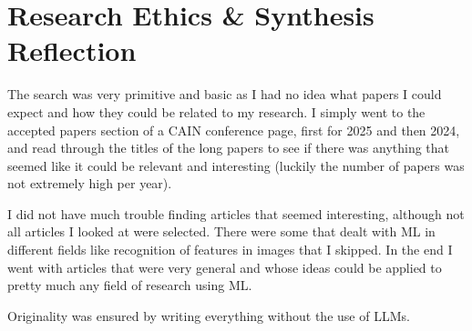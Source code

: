 \documentclass[11pt]{article}
\begin{document}
\begin{comment}
    3: get the best hyperparameter combination based on whatever performance metric you like (calculated for each combination of parameters)
    \item what was evaluated: effectiveness of t-way testing for hpo compared to the others + different values of t for time efficiency & model performance
    \item used t = 2 as they found out that it's enough
    \item used the same number of runs for all hpo strategies (because they wanted to be fair), but does it not make sense to use however many make sense for the particular method? if it's fewer than the others, is that not a strength of the method?
    \item they talk a lot about the performance gains from t-way testing, but not much about the time efficiency (where bayesian optimisation was best most of the time)
\end{itemize}

\end{comment}

\section{Research Ethics \& Synthesis Reflection}

The search was very primitive and basic as I had no idea what papers I could expect and how they could be related to my research. I simply went to the accepted papers section of a CAIN conference page, first for 2025 and then 2024, and read through the titles of the long papers to see if there was anything that seemed like it could be relevant and interesting (luckily the number of papers was not extremely high per year).

I did not have much trouble finding articles that seemed interesting, although not all articles I looked at were selected. There were some that dealt with ML in different fields like recognition of features in images that I skipped. In the end I went with articles that were very general and whose ideas could be applied to pretty much any field of research using ML.

Originality was ensured by writing everything without the use of LLMs.
\end{document}
